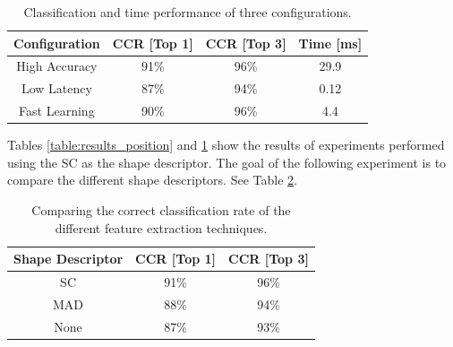 \documentclass[10pt, conference, compsocconf]{IEEEtran}
\begin{document}
\begin{table}
\centering
\renewcommand{\arraystretch}{1.2}
\begin{tabular}{ | c | c | c | c |}
  \hline
  \textbf{Configuration}  & \textbf{CCR [Top 1]}  & \textbf{CCR [Top 3]} & \textbf{Time [ms]}\\
  \hline
  High Accuracy & 91\% & 96\% & 29.9 \\ 
  \hline
  Low Latency   & 87\% & 94\% & 0.12 \\
  \hline
  Fast Learning & 90\% & 96\% & 4.4 \\ 
  \hline
\end{tabular}
\caption{Classification and time performance of three configurations.}
\label{table:configurations} 
\end{table}

Tables \ref{table:results_position} and \ref{table:configurations} show the results of experiments performed using the SC as the shape descriptor.
The goal of the following experiment is to compare the different shape descriptors. See Table \ref{table:features_comparison}.

\begin{table}
\centering
\renewcommand{\arraystretch}{1.2}
\begin{tabular}{ | c | c | c |}
\hline
	\textbf{Shape Descriptor}  & \textbf{CCR [Top 1]}  & \textbf{CCR [Top 3]} \\
	\hline 
	SC      & 91\% & 96\%  \\                
  	\hline
  	MAD     & 88\% & 94\% \\
  	\hline
  	None    & 87\% & 93\% \\
  	\hline
\end{tabular}
\caption{Comparing the correct classification rate of the different feature extraction techniques.}
\label{table:features_comparison} 
\end{table}
\end{document}
